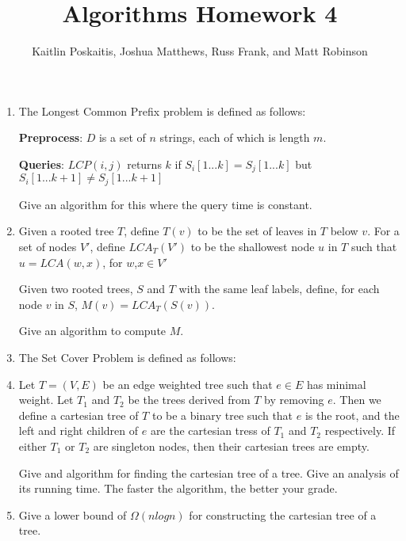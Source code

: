 \documentclass[12pt]{article}
\title{\bf Algorithms Homework 4}
\author{Kaitlin Poskaitis, Joshua Matthews, Russ Frank, and Matt Robinson}
\date{}
\begin{document}
\maketitle

\begin{enumerate}
\item The Longest Common Prefix problem is defined as follows:

    {\bf Preprocess}: $D$ is a set of $n$ strings, each of which is
        length $m$.

    {\bf Queries}: $LCP(i,j)$ returns $k$ if $S_i[1...k] = S_j[1...k]$
        but $S_i[1...k+1] \neq S_j[1...k+1]$

Give an algorithm for this where the query time is constant.

\item Given a rooted tree $T$, define $T(v)$ to be the set of leaves in $T$
    below $v$. For a set of nodes $V'$, define $LCA_T(V')$ to be the shallowest
    node $u$ in $T$ such that $u = LCA(w,x)$, for $w$,$x \in V'$

    Given two rooted trees, $S$ and $T$ with the same leaf labels, define, for
    each node $v$ in $S$, $M(v) = LCA_T(S(v))$.

    Give an algorithm to compute $M$.

\item The Set Cover Problem is defined as follows:

\item Let $T = (V,E)$ be an edge weighted tree such that $e \in E$ has minimal
    weight.  Let $T_1$ and $T_2$ be the trees derived from $T$ by removing $e$.
    Then we define a cartesian tree of $T$ to be a binary tree such that $e$ is
    the root, and the left and right children of $e$ are the cartesian tress of
    $T_1$ and $T_2$ respectively. If either $T_1$ or $T_2$ are singleton nodes,
    then their cartesian trees are empty.

    Give and algorithm for finding the cartesian tree of a tree. Give an
    analysis of its running time. The faster the algorithm, the better your
    grade.

\item Give a lower bound of $\Omega(nlogn)$ for constructing the cartesian tree
    of a tree.

\end{enumerate}
\end{document}
